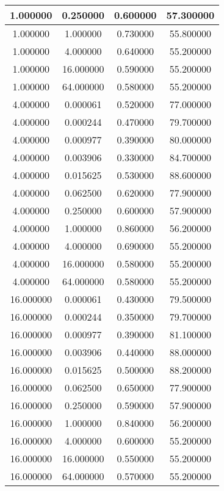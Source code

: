 \documentclass[12pt]{article}
\begin{document}
\begin{enumerate}[label=\alph*.]
\begin{longtable}{| c | c | c | c |}
		\hline
		1.000000 & 0.250000 & 0.600000 & 57.300000 \\
		\hline
		1.000000 & 1.000000 & 0.730000 & 55.800000 \\
		\hline
		1.000000 & 4.000000 & 0.640000 & 55.200000 \\
		\hline
		1.000000 & 16.000000 & 0.590000 & 55.200000 \\
		\hline
		1.000000 & 64.000000 & 0.580000 & 55.200000 \\
		\hline
		4.000000 & 0.000061 & 0.520000 & 77.000000 \\
		\hline
		4.000000 & 0.000244 & 0.470000 & 79.700000 \\
		\hline
		4.000000 & 0.000977 & 0.390000 & 80.000000 \\
		\hline
		4.000000 & 0.003906 & 0.330000 & 84.700000 \\
		\hline
		4.000000 & 0.015625 & 0.530000 & 88.600000 \\
		\hline
		4.000000 & 0.062500 & 0.620000 & 77.900000 \\
		\hline
		4.000000 & 0.250000 & 0.600000 & 57.900000 \\
		\hline
		4.000000 & 1.000000 & 0.860000 & 56.200000 \\
		\hline
		4.000000 & 4.000000 & 0.690000 & 55.200000 \\
		\hline
		4.000000 & 16.000000 & 0.580000 & 55.200000 \\
		\hline
		4.000000 & 64.000000 & 0.580000 & 55.200000 \\
		\hline
		16.000000 & 0.000061 & 0.430000 & 79.500000 \\
		\hline
		16.000000 & 0.000244 & 0.350000 & 79.700000 \\
		\hline
		16.000000 & 0.000977 & 0.390000 & 81.100000 \\
		\hline
		16.000000 & 0.003906 & 0.440000 & 88.000000 \\
		\hline
		16.000000 & 0.015625 & 0.500000 & 88.200000 \\
		\hline
		16.000000 & 0.062500 & 0.650000 & 77.900000 \\
		\hline
		16.000000 & 0.250000 & 0.590000 & 57.900000 \\
		\hline
		16.000000 & 1.000000 & 0.840000 & 56.200000 \\
		\hline
		16.000000 & 4.000000 & 0.600000 & 55.200000 \\
		\hline
		16.000000 & 16.000000 & 0.550000 & 55.200000 \\
		\hline
		16.000000 & 64.000000 & 0.570000 & 55.200000 \\

\end{longtable}
\end{enumerate}
\end{document}
